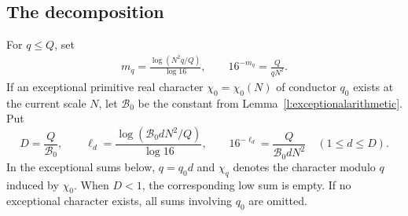 \documentclass[12pt,reqno]{amsart}
\numberwithin{equation}{section}
\theoremstyle{definition}
\theoremstyle{remark}
\begin{document}
\subsection{The decomposition}

For \(q\leq Q\), set
\begin{align}\label{e:mqdef}
 m_q=\frac{\log(N^2q/Q)}{\log16},
 \qquad
 16^{-m_q}=\frac{Q}{qN^2}.
\end{align}
If an exceptional primitive real character \(\chi_0=\chi_0(N)\) of
conductor \(q_0\) exists at the current scale \(N\), let
\(\mathcal B_0\) be the constant from
Lemma~\ref{l:exceptionalarithmetic}.  Put
\[
 D=\frac{Q}{\mathcal B_0},\qquad
 \ell_d=\frac{\log(\mathcal B_0dN^2/Q)}{\log16},\qquad
 16^{-\ell_d}=\frac{Q}{\mathcal B_0dN^2}
 \quad(1\le d\le D).
\]
In the exceptional sums below, \(q=q_0d\) and \(\chi_q\) denotes the
character modulo \(q\) induced by \(\chi_0\).  When \(D<1\), the
corresponding low sum is empty.  If no exceptional character exists,
all sums involving \(q_0\) are omitted.
\end{document}
